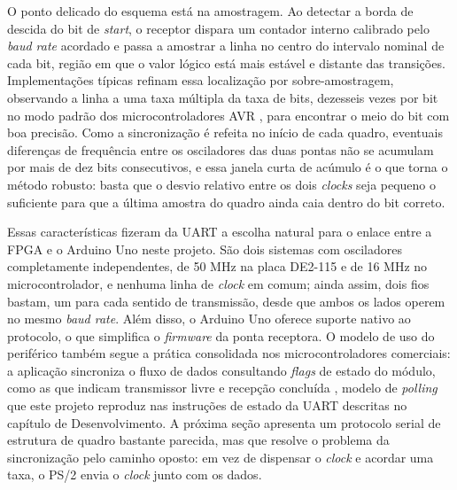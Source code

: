 \documentclass[
	12pt,
	oneside,
	a4paper,
	english,
	french,
	spanish,
	brazil,
	]{abntex2}
\begin{document}
O ponto delicado do esquema está na amostragem. Ao detectar a borda de descida do bit de \emph{start}, o receptor dispara um contador interno calibrado pelo \emph{baud rate} acordado e passa a amostrar a linha no centro do intervalo nominal de cada bit, região em que o valor lógico está mais estável e distante das transições. Implementações típicas refinam essa localização por sobre-amostragem, observando a linha a uma taxa múltipla da taxa de bits, dezesseis vezes por bit no modo padrão dos microcontroladores AVR \cite{microchip_tb3216}, para encontrar o meio do bit com boa precisão. Como a sincronização é refeita no início de cada quadro, eventuais diferenças de frequência entre os osciladores das duas pontas não se acumulam por mais de dez bits consecutivos, e essa janela curta de acúmulo é o que torna o método robusto: basta que o desvio relativo entre os dois \emph{clocks} seja pequeno o suficiente para que a última amostra do quadro ainda caia dentro do bit correto.

Essas características fizeram da UART a escolha natural para o enlace entre a FPGA e o Arduino Uno neste projeto. São dois sistemas com osciladores completamente independentes, de 50 MHz na placa DE2-115 e de 16 MHz no microcontrolador, e nenhuma linha de \emph{clock} em comum; ainda assim, dois fios bastam, um para cada sentido de transmissão, desde que ambos os lados operem no mesmo \emph{baud rate}. Além disso, o Arduino Uno oferece suporte nativo ao protocolo, o que simplifica o \emph{firmware} da ponta receptora. O modelo de uso do periférico também segue a prática consolidada nos microcontroladores comerciais: a aplicação sincroniza o fluxo de dados consultando \emph{flags} de estado do módulo, como as que indicam transmissor livre e recepção concluída \cite{microchip_tb3216}, modelo de \emph{polling} que este projeto reproduz nas instruções de estado da UART descritas no capítulo de Desenvolvimento. A próxima seção apresenta um protocolo serial de estrutura de quadro bastante parecida, mas que resolve o problema da sincronização pelo caminho oposto: em vez de dispensar o \emph{clock} e acordar uma taxa, o PS/2 envia o \emph{clock} junto com os dados.
\end{document}

